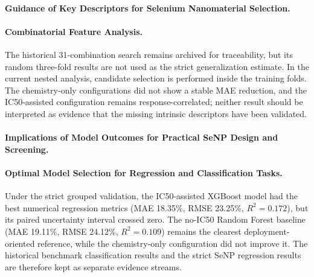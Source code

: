 \paragraph{Guidance of Key Descriptors for Selenium Nanomaterial Selection.}

\paragraph{Combinatorial Feature Analysis.}
The historical 31-combination search remains archived for traceability, but its random three-fold results are not used as the strict generalization estimate. In the current nested analysis, candidate selection is performed inside the training folds. The chemistry-only configurations did not show a stable MAE reduction, and the IC50-assisted configuration remains response-correlated; neither result should be interpreted as evidence that the missing intrinsic descriptors have been validated.

\paragraph{Implications of Model Outcomes for Practical SeNP Design and Screening.}

\paragraph{Optimal Model Selection for Regression and Classification Tasks.}
Under the strict grouped validation, the IC50-assisted XGBoost model had the best numerical regression metrics (MAE 18.35\%, RMSE 23.25\%, $R^2=0.172$), but its paired uncertainty interval crossed zero. The no-IC50 Random Forest baseline (MAE 19.11\%, RMSE 24.12\%, $R^2=0.109$) remains the clearest deployment-oriented reference, while the chemistry-only configuration did not improve it. The historical benchmark classification results and the strict SeNP regression results are therefore kept as separate evidence streams.

